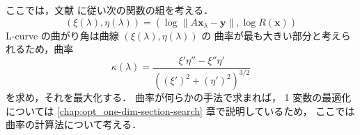 ここでは，文献 \cite{Hansen1998} に従い次の関数の組を考える．
\begin{equation}
    (\xi(\lambda), \eta(\lambda))
    =(\log\|A \bm{x}_\lambda - \bm{y}\|, \log{R(\bm{x})})
\end{equation}
L-curve の曲がり角は曲線 $(\xi(\lambda), \eta(\lambda))$ の
曲率が最も大きい部分と考えられるため，曲率
\begin{equation}
    \kappa(\lambda) =
    \frac{\xi'\eta'' - \xi''\eta'}
    {\left( (\xi')^2 + (\eta')^2 \right)^{3/2}}
\end{equation}
を求め，それを最大化する．
曲率が何らかの手法で求まれば，
1 変数の最適化については
\ref{chap:opt_one-dim-section-search} 章で説明しているため，
ここでは曲率の計算法について考える．
